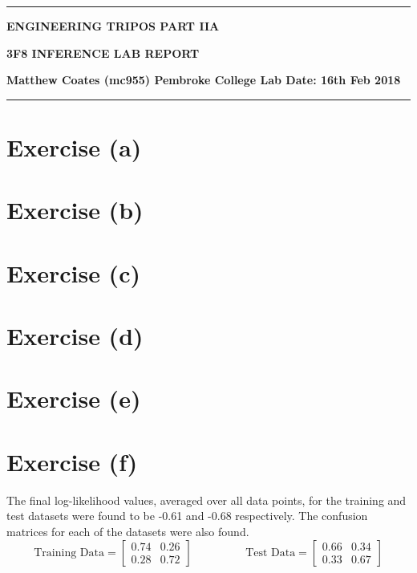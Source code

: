\documentclass[12pt]{article}
\begin{document}

\clearpage \mbox{}  \clearpage
{}

\noindent
\rule{17cm}{0.5mm}
\begin{center}
{\bf ENGINEERING TRIPOS PART IIA}
\end{center}
\begin{center}
{\bf 3F8 INFERENCE LAB REPORT}
\end{center}
{\bf Matthew Coates (mc955) \hfill Pembroke College \hfill Lab Date: 16th Feb 2018}
\rule{17cm}{0.5mm}

\section*{Exercise (a)}

\section*{Exercise (b)}

\section*{Exercise (c)}

\section*{Exercise (d)}

\section*{Exercise (e)}

\section*{Exercise (f)}
The final log-likelihood values, averaged over all data points, for the training and test datasets were found to be -0.61 and -0.68 respectively. The confusion matrices for each of the datasets were also found. 
\begin{equation*}
  \text{Training Data} = 
  \begin{bmatrix}
    0.74 & 0.26  \\
    0.28 & 0.72 
  \end{bmatrix}
  \hspace{2cm}
  \text{Test Data} =
  \begin{bmatrix}
    0.66 & 0.34  \\
    0.33 & 0.67 
  \end{bmatrix}
\end{equation*}
\end{document}
